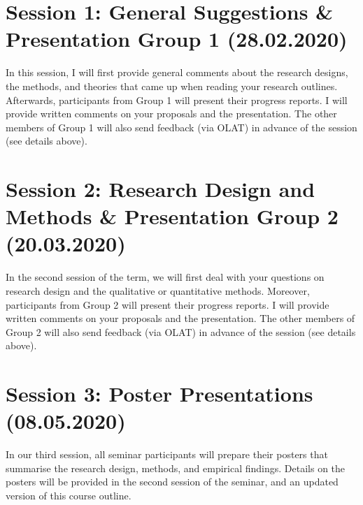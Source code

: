 \documentclass[abstract=on,parskip=full,headings=standardclasses,fontsize=11pt,paper=a4]{scrartcl}
\begin{document}
\section{Session 1: General Suggestions \& Presentation Group 1 (28.02.2020)}

In this session, I will first provide general comments about the research designs, the methods, and theories that came up when reading your research outlines. Afterwards, participants from Group 1 will present their progress reports.  I will provide written comments on your proposals and the presentation. The other members of Group 1 will also send feedback (via OLAT) in advance of the session (see details above).



\section{Session 2: Research Design and Methods \& Presentation Group 2 (20.03.2020)}

In the second session of the term, we will first deal with your questions on research design and the qualitative or quantitative methods. Moreover, participants from Group 2 will present their progress reports.  I will provide written comments on your proposals and the presentation. The other members of Group 2 will also send feedback (via OLAT) in advance of the session (see details above).



\section{Session 3: Poster Presentations (08.05.2020)}

In our third session, all seminar participants will prepare their posters that summarise the research design, methods, and  empirical findings. Details on the posters will be provided in the second session of the seminar, and an updated version of this course outline. 
\end{document}
